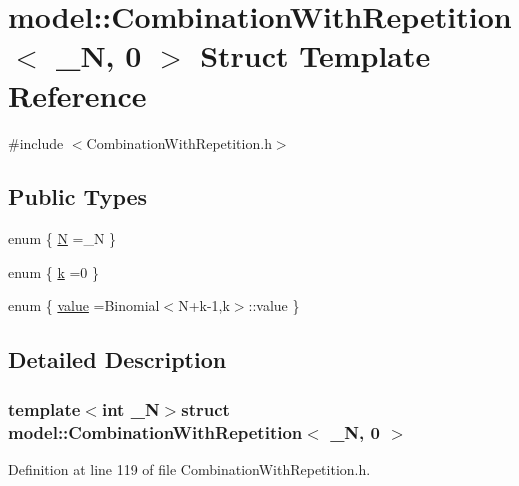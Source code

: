 \hypertarget{structmodel_1_1_combination_with_repetition_3_01___n_00_010_01_4}{}\section{model\+:\+:Combination\+With\+Repetition$<$ \+\_\+\+N, 0 $>$ Struct Template Reference}
\label{structmodel_1_1_combination_with_repetition_3_01___n_00_010_01_4}


{\ttfamily \#include $<$Combination\+With\+Repetition.\+h$>$}

\subsection*{Public Types}
\begin{DoxyCompactItemize}
\item 
enum \{ \hyperlink{structmodel_1_1_combination_with_repetition_3_01___n_00_010_01_4_a247596ae09909bb9fac481a768633dfba9c7c62fc99e98cf9f9f8b2dd7519b4bf}{N} =\+\_\+\+N
 \}
\item 
enum \{ \hyperlink{structmodel_1_1_combination_with_repetition_3_01___n_00_010_01_4_a373db59a949a6a40085c6533e6cae418aa9b18fed3b6676f2489aabec765c2e38}{k} =0
 \}
\item 
enum \{ \hyperlink{structmodel_1_1_combination_with_repetition_3_01___n_00_010_01_4_ac784a3fc45a4eec8ac24591668258a4ba281a0a9bd8f045f76a3bde5b2c89fe57}{value} =Binomial$<$N+k-\/1,k$>$\+:\+:value
 \}
\end{DoxyCompactItemize}


\subsection{Detailed Description}
\subsubsection*{template$<$int \+\_\+\+N$>$struct model\+::\+Combination\+With\+Repetition$<$ \+\_\+\+N, 0 $>$}



Definition at line 119 of file Combination\+With\+Repetition.\+h.



